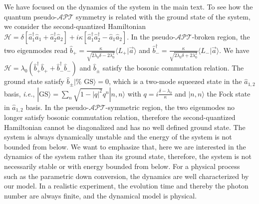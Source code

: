 \documentclass[twocolumn,prl,floatfix,citeautoscript,nofootinbib,superscriptaddress]{revtex4}
\begin{document}
\begin{widetext}
We have focused on the dynamics of the system in the main text. To see how
the quantum pseudo-$\mathcal{APT}$ symmetry is related with the ground state
of the system, we consider the second-quantized Hamiltonian $\mathcal{H}%
=\delta \left[ \hat{a}_{1}^{\dag }\hat{a}_{1}+\hat{a}_{2}^{\dag }\hat{a}_{2}%
\right] +i\kappa \left[ \hat{a}_{1}^{\dag }\hat{a}_{2}^{\dag }-\hat{a}_{1}%
\hat{a}_{2}\right] $. In the pseudo-$\mathcal{APT}$-broken region, the two
eigenmodes read $\hat{b}_{+}=\frac{\kappa }{\sqrt{2\lambda _{0}\delta
-2\lambda _{0}^{2}}}\langle L_{+}|\vec{a}\rangle $ and $\hat{b}_{-}^{\dag }=%
\frac{\kappa }{\sqrt{2\lambda _{0}\delta +2\lambda _{0}^{2}}}\langle L_{-}|%
\vec{a}\rangle $. We have $\mathcal{H}=\lambda _{0}(\hat{b}_{+}^{\dag }\hat{b%
}_{+}+\hat{b}_{-}^{\dag }\hat{b}_{-})$ and $\hat{b}_{\pm }$ satisfy the
bosonic commutation relation. The ground state satisfy $\hat{b}_{\pm }|\text{%
GS}\rangle =0$, which is a two-mode squeezed state in the $\hat{a}_{1,2}$
basis, \textit{i.e.}, $|\text{GS}\rangle =\sum_{n}\sqrt{1-|q|^{2}}%
q^{n}|n,n\rangle $ with $q=i\frac{\delta -\lambda _{0}}{\kappa }$ and $%
|n,n\rangle $ the Fock state in $\hat{a}_{1,2}$ basis. In the pseudo-$%
\mathcal{APT}$-symmetric region, the two eigenmodes no longer satisfy
bosonic commutation relation, therefore the second-quantized Hamiltonian
cannot be diagonalized and has no well defined ground state. The system is
always dynamically unstable and the energy of the system is not bounded from
below. We want to emphasize that, here we are interested in the dynamics of
the system rather than its ground state, therefore, the system is not
necessarily stable or with energy bounded from below. For a physical process
such as the parametric down conversion, the dynamics are well characterized
by our model. In a realistic experiment, the evolution time and thereby the
photon number are always finite, and the dynamical model is physical.


\end{widetext}
\end{document}
